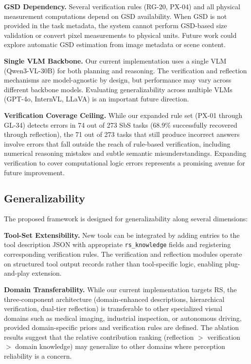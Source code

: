 \documentclass[journal]{IEEEtran}
\begin{document}
\textbf{GSD Dependency.}
Several verification rules (RG-20, PX-04) and all physical measurement computations depend on GSD availability.
When GSD is not provided in the task metadata, the system cannot perform GSD-based size validation or convert pixel measurements to physical units.
Future work could explore automatic GSD estimation from image metadata or scene content.

\textbf{Single VLM Backbone.}
Our current implementation uses a single VLM (Qwen3-VL-30B) for both planning and reasoning.
The verification and reflection mechanisms are model-agnostic by design, but performance may vary across different backbone models.
Evaluating generalizability across multiple VLMs (GPT-4o, InternVL, LLaVA) is an important future direction.

\textbf{Verification Coverage Ceiling.}
While our expanded rule set (PX-01 through GL-34) detects errors in 74 out of 273 SbS tasks (68.9\% successfully recovered through reflection), the 71 out of 273 tasks that still produce incorrect answers involve errors that fall outside the reach of rule-based verification, including numerical reasoning mistakes and subtle semantic misunderstandings.
Expanding verification to cover computational logic errors represents a promising avenue for future improvement.

\subsection{Generalizability}

The proposed framework is designed for generalizability along several dimensions:

\textbf{Tool-Set Extensibility.}
New tools can be integrated by adding entries to the tool description JSON with appropriate \texttt{rs\_knowledge} fields and registering corresponding verification rules.
The verification and reflection modules operate on structured tool output records rather than tool-specific logic, enabling plug-and-play extension.

\textbf{Domain Transferability.}
While our current implementation targets RS, the three-component architecture (domain-enhanced descriptions, hierarchical verification, dual-tier reflection) is transferable to other specialized visual domains such as medical imaging, industrial inspection, or autonomous driving, provided domain-specific priors and verification rules are defined.
The ablation results suggest that the relative contribution ranking (reflection $>$ verification $>$ domain knowledge) may generalize to other domains where perception reliability is a concern.
\end{document}

